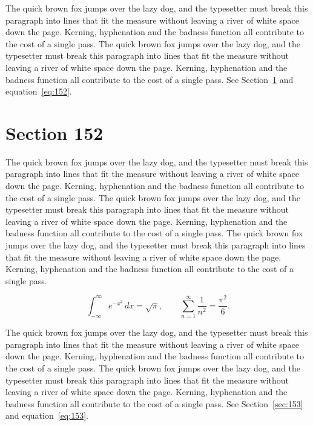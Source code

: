 \documentclass{article}
\begin{document}
The quick brown fox jumps over the lazy dog, and the typesetter must break this paragraph into lines that fit the measure without leaving a river of white space down the page. Kerning, hyphenation and the badness function all contribute to the cost of a single pass. The quick brown fox jumps over the lazy dog, and the typesetter must break this paragraph into lines that fit the measure without leaving a river of white space down the page. Kerning, hyphenation and the badness function all contribute to the cost of a single pass. 
See Section~\ref{sec:152} and equation~\eqref{eq:152}.
\section{Section 152}
\label{sec:152}
The quick brown fox jumps over the lazy dog, and the typesetter must break this paragraph into lines that fit the measure without leaving a river of white space down the page. Kerning, hyphenation and the badness function all contribute to the cost of a single pass. The quick brown fox jumps over the lazy dog, and the typesetter must break this paragraph into lines that fit the measure without leaving a river of white space down the page. Kerning, hyphenation and the badness function all contribute to the cost of a single pass. The quick brown fox jumps over the lazy dog, and the typesetter must break this paragraph into lines that fit the measure without leaving a river of white space down the page. Kerning, hyphenation and the badness function all contribute to the cost of a single pass. 

\begin{equation}\label{eq:152}
\int_{-\infty}^{\infty} e^{-x^{2}}\,dx = \sqrt{\pi}, \qquad
\sum_{n=1}^{\infty} \frac{1}{n^{2}} = \frac{\pi^{2}}{6}.
\end{equation}

The quick brown fox jumps over the lazy dog, and the typesetter must break this paragraph into lines that fit the measure without leaving a river of white space down the page. Kerning, hyphenation and the badness function all contribute to the cost of a single pass. The quick brown fox jumps over the lazy dog, and the typesetter must break this paragraph into lines that fit the measure without leaving a river of white space down the page. Kerning, hyphenation and the badness function all contribute to the cost of a single pass. 
See Section~\ref{sec:153} and equation~\eqref{eq:153}.
\end{document}
